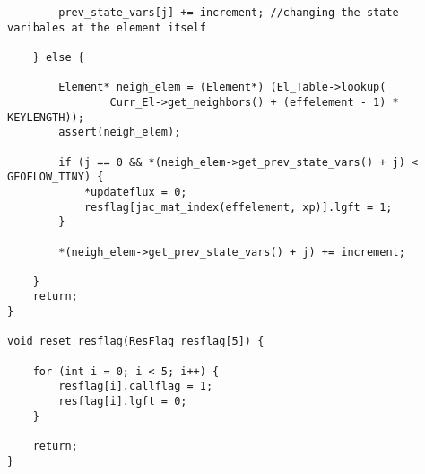 \documentclass[a4paper,10pt]{article}
\begin{document}
\begin{lstlisting}
		prev_state_vars[j] += increment; //changing the state varibales at the element itself

	} else {

		Element* neigh_elem = (Element*) (El_Table->lookup(
				Curr_El->get_neighbors() + (effelement - 1) * KEYLENGTH));
		assert(neigh_elem);

		if (j == 0 && *(neigh_elem->get_prev_state_vars() + j) < GEOFLOW_TINY) {
			*updateflux = 0;
			resflag[jac_mat_index(effelement, xp)].lgft = 1;
		}

		*(neigh_elem->get_prev_state_vars() + j) += increment;

	}
	return;
}

void reset_resflag(ResFlag resflag[5]) {

	for (int i = 0; i < 5; i++) {
		resflag[i].callflag = 1;
		resflag[i].lgft = 0;
	}

	return;
}
\end{lstlisting}
\end{document}
